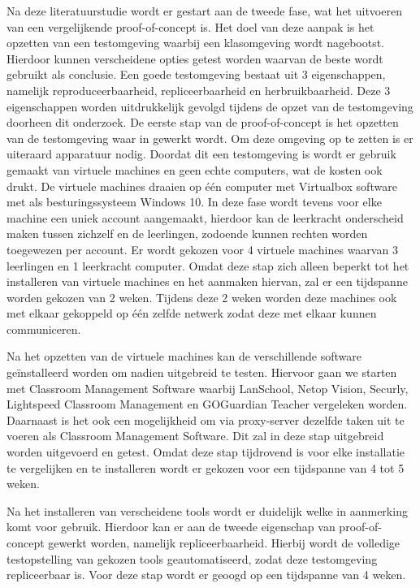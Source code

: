 Na deze literatuurstudie wordt er gestart aan de tweede fase, wat het uitvoeren van een vergelijkende proof-of-concept is. Het doel van deze aanpak is het opzetten van een testomgeving waarbij een klasomgeving wordt nagebootst. Hierdoor kunnen verscheidene opties getest worden waarvan de beste wordt gebruikt als conclusie. Een goede testomgeving bestaat uit 3 eigenschappen, namelijk reproduceerbaarheid, repliceerbaarheid en herbruikbaarheid. Deze 3 eigenschappen worden uitdrukkelijk gevolgd tijdens de opzet van de testomgeving doorheen dit onderzoek. De eerste stap van de proof-of-concept is het opzetten van de testomgeving waar in gewerkt wordt. Om deze omgeving op te zetten is er uiteraard apparatuur nodig. Doordat dit een testomgeving is wordt er gebruik gemaakt van virtuele machines en geen echte computers, wat de kosten ook drukt. De virtuele machines draaien op één computer met Virtualbox software met als besturingssysteem Windows 10. In deze fase wordt tevens voor elke machine een uniek account aangemaakt, hierdoor kan de leerkracht onderscheid maken tussen zichzelf en de leerlingen, zodoende kunnen rechten worden toegewezen per account. Er wordt gekozen voor 4 virtuele machines waarvan 3 leerlingen en 1 leerkracht computer. Omdat deze stap zich alleen beperkt tot het installeren van virtuele machines en het aanmaken hiervan, zal er een tijdspanne worden gekozen van 2 weken. Tijdens deze 2 weken worden deze machines ook met elkaar gekoppeld op één zelfde netwerk zodat deze met elkaar kunnen communiceren. \newline

Na het opzetten van de virtuele machines kan de verschillende software geïnstalleerd worden om nadien uitgebreid te testen. Hiervoor gaan we starten met Classroom Management Software waarbij LanSchool, Netop Vision, Securly, Lightspeed Classroom Management en GOGuardian Teacher vergeleken worden. Daarnaast is het ook een mogelijkheid om via proxy-server dezelfde taken uit te voeren als Classroom Management Software. Dit zal in deze stap uitgebreid worden uitgevoerd en getest. Omdat deze stap tijdrovend is voor elke installatie te vergelijken en te installeren wordt er gekozen voor een tijdspanne van 4 tot 5 weken.  \newline

Na het installeren van verscheidene tools wordt er duidelijk welke in aanmerking komt voor gebruik. Hierdoor kan er aan de tweede eigenschap van proof-of-concept gewerkt worden, namelijk repliceerbaarheid. Hierbij wordt de volledige testopstelling van gekozen tools geautomatiseerd, zodat deze testomgeving repliceerbaar is. Voor deze stap wordt er geoogd op een tijdspanne van 4 weken. \newline


